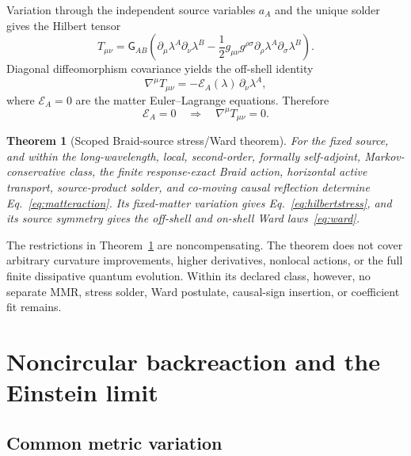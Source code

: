 \documentclass[11pt]{article}
\newtheorem{theorem}{Theorem}[section]
\theoremstyle{definition}
\theoremstyle{remark}
\begin{document}
Variation through the independent source variables $a_A$ and the unique solder gives the Hilbert tensor
\begin{equation}\label{eq:hilbertstress}
 T_{\mu\nu}=\mathsf G_{AB}
 \left(
 \partial_{\mu}\lambda^A\partial_{\nu}\lambda^B
 -\frac12g_{\mu\nu}g^{\rho\sigma}
 \partial_{\rho}\lambda^A\partial_{\sigma}\lambda^B
 \right).
\end{equation}
Diagonal diffeomorphism covariance yields the off-shell identity
\begin{equation}\label{eq:ward}
 \nabla^{\mu}T_{\mu\nu}=-\mathcal E_A(\lambda)\,\partial_{\nu}\lambda^A,
\end{equation}
where $\mathcal E_A=0$ are the matter Euler--Lagrange equations. Therefore
\begin{equation}
 \mathcal E_A=0\quad\Longrightarrow\quad\nabla^{\mu}T_{\mu\nu}=0.
\end{equation}

\begin{theorem}[Scoped Braid-source stress/Ward theorem]\label{thm:ward}
For the fixed source, and within the long-wavelength, local, second-order, formally self-adjoint, Markov-conservative class, the finite response-exact Braid action, horizontal active transport, source-product solder, and co-moving causal reflection determine Eq.~\eqref{eq:matteraction}. Its fixed-matter variation gives Eq.~\eqref{eq:hilbertstress}, and its source symmetry gives the off-shell and on-shell Ward laws~\eqref{eq:ward}.
\end{theorem}

The restrictions in Theorem~\ref{thm:ward} are noncompensating. The theorem does not cover arbitrary curvature improvements, higher derivatives, nonlocal actions, or the full finite dissipative quantum evolution. Within its declared class, however, no separate MMR, stress solder, Ward postulate, causal-sign insertion, or coefficient fit remains.

\section{Noncircular backreaction and the Einstein limit}

\subsection{Common metric variation}
\end{document}
